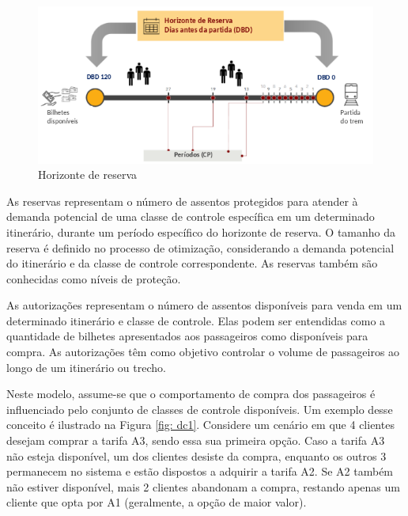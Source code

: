 \begin{description}[style=unboxed, leftmargin=0cm]
        \begin{figure}[H]
            \begin{center}
                \includegraphics[scale=0.53]{img/h_reserva.png}
                \caption{Horizonte de reserva}
                \label{fig: h_reserva}
            \end{center}
        \end{figure}

	\item[Reservas:] As reservas representam o número de assentos protegidos para atender à demanda potencial de uma classe de controle específica em um determinado itinerário, durante um período específico do horizonte de reserva. O tamanho da reserva é definido no processo de otimização, considerando a demanda potencial do itinerário e da classe de controle correspondente. As reservas também são conhecidas como níveis de proteção.

	\item[Autorizações:] As autorizações representam o número de assentos disponíveis para venda em um determinado itinerário e classe de controle. Elas podem ser entendidas como a quantidade de bilhetes apresentados aos passageiros como disponíveis para compra. As autorizações têm como objetivo controlar o volume de passageiros ao longo de um itinerário ou trecho.

	\item[Demanda comportamental:] Neste modelo, assume-se que o comportamento de compra dos passageiros é influenciado pelo conjunto de classes de controle disponíveis. Um exemplo desse conceito é ilustrado na Figura \ref{fig: dc1}. Considere um cenário em que 4 clientes desejam comprar a tarifa A3, sendo essa sua primeira opção. Caso a tarifa A3 não esteja disponível, um dos clientes desiste da compra, enquanto os outros 3 permanecem no sistema e estão dispostos a adquirir a tarifa A2. Se A2 também não estiver disponível, mais 2 clientes abandonam a compra, restando apenas um cliente que opta por A1 (geralmente, a opção de maior valor).


\end{description}
